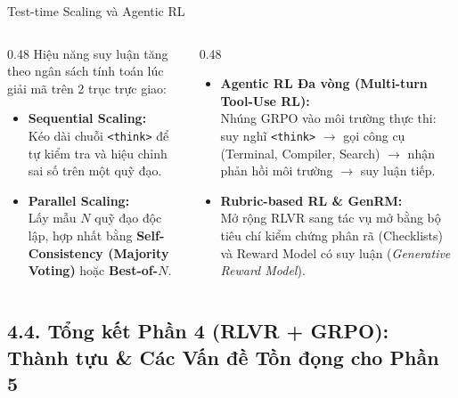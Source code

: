 \begin{frame}{Test-time Scaling và Agentic RL}
  \begin{columns}[T,onlytextwidth]
    \begin{column}{0.48\textwidth}
      \small
      Hiệu năng suy luận tăng theo ngân sách tính toán lúc giải mã trên 2 trục trực giao:
      \begin{itemize}\setlength{\itemsep}{4pt}
        \item \textbf{Sequential Scaling:}\\
          Kéo dài chuỗi \texttt{<think>} để tự kiểm tra và hiệu chỉnh sai số trên một quỹ đạo.
        \item \textbf{Parallel Scaling:}\\
          Lấy mẫu $N$ quỹ đạo độc lập, hợp nhất bằng \textbf{Self-Consistency (Majority Voting)} hoặc \textbf{Best-of-$N$}.
      \end{itemize}
    \end{column}
    \begin{column}{0.48\textwidth}
      \small
      \begin{itemize}\setlength{\itemsep}{4pt}
        \item \textbf{Agentic RL Đa vòng (Multi-turn Tool-Use RL):}\\
          Nhúng GRPO vào môi trường thực thi: suy nghĩ \texttt{<think>} $\to$ gọi công cụ (Terminal, Compiler, Search) $\to$ nhận phản hồi môi trường $\to$ suy luận tiếp.
        \item \textbf{Rubric-based RL \& GenRM:}\\
          Mở rộng RLVR sang tác vụ mở bằng bộ tiêu chí kiểm chứng phân rã (Checklists) và Reward Model có suy luận (\textit{Generative Reward Model}).
      \end{itemize}
    \end{column}
  \end{columns}
  \par\vspace{0pt}
\end{frame}

\subsection{4.4. Tổng kết Phần 4 (RLVR + GRPO): Thành tựu \& Các Vấn đề Tồn đọng cho Phần 5}

